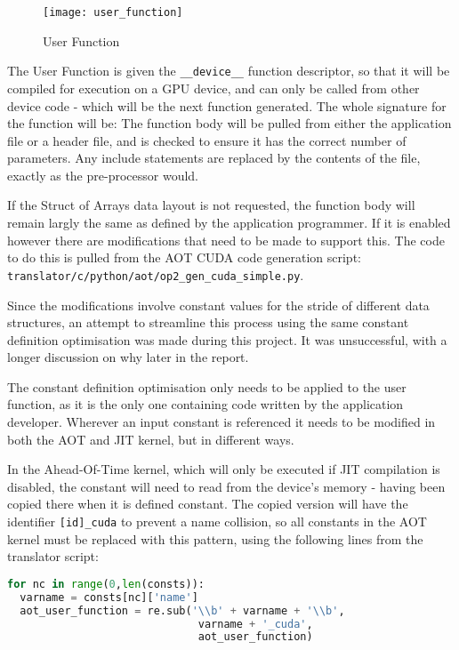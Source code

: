 \begin{wrapfigure}[12]{r}{.33\textwidth}
  \centering
  \caption{User Function}
  \label{fig:usr_func}
  \texttt{[image: user\_function]}
\end{wrapfigure}
The User Function is given the \verb|__device__| function  descriptor, so that it will be compiled for execution on a GPU device, and can only be called from other device code - which will be the next function generated. The whole signature for the function will be:
\noindent The function body will be pulled from either the application file or a header file, and is checked to ensure it has the correct number of parameters. Any include statements are replaced by the contents of the file, exactly as the pre-processor would.
\par
{} If the Struct of Arrays data layout is not requested, the function body will remain largly the same as defined by the application programmer. If it is enabled however there are modifications that need to be made to support this. The code to do this is pulled from the AOT CUDA code generation script: \\\verb|translator/c/python/aot/op2_gen_cuda_simple.py|.
\par
Since the modifications involve constant values for the stride of different data structures, an attempt to streamline this process using the same constant definition optimisation was made during this project. It was unsuccessful, with a longer discussion on why later in the report.
\par
{} The constant definition optimisation only needs to be applied to the user function, as it is the only one containing code written by the application developer. Wherever an input constant is referenced it needs to be modified in both the AOT and JIT kernel, but in different ways.

In the Ahead-Of-Time kernel, which will only be executed if JIT compilation is disabled, the constant will need to read from the device's memory - having been copied there when it is defined constant. The copied version will have the identifier \verb|[id]_cuda| to prevent a name collision, so all constants in the AOT kernel must be replaced with this pattern, using the following lines from the translator script:\\
\begin{lstlisting}[backgroundcolor = \color{lightgray!20}, language=Python]
for nc in range(0,len(consts)):
  varname = consts[nc]['name']
  aot_user_function = re.sub('\\b' + varname + '\\b',
                              varname + '_cuda',
                              aot_user_function)
\end{lstlisting}

